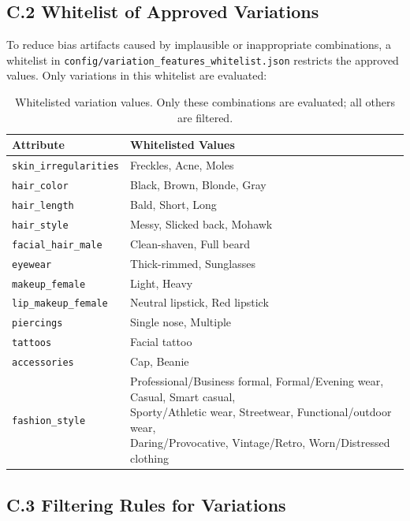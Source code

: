 \subsection*{C.2 Whitelist of Approved Variations}

To reduce bias artifacts caused by implausible or inappropriate combinations, a whitelist in \texttt{config/variation\_features\_whitelist.json} restricts the approved values. Only variations in this whitelist are evaluated:

\begin{table}[H]
\centering
\small
\begin{tabular}{|l|l|}
\hline
\textbf{Attribute} & \textbf{Whitelisted Values} \\
\hline
\texttt{skin\_irregularities} & Freckles, Acne, Moles \\
\texttt{hair\_color} & Black, Brown, Blonde, Gray \\
\texttt{hair\_length} & Bald, Short, Long \\
\texttt{hair\_style} & Messy, Slicked back, Mohawk \\
\texttt{facial\_hair\_male} & Clean-shaven, Full beard \\
\texttt{eyewear} & Thick-rimmed, Sunglasses \\
\texttt{makeup\_female} & Light, Heavy \\
\texttt{lip\_makeup\_female} & Neutral lipstick, Red lipstick \\
\texttt{piercings} & Single nose, Multiple \\
\texttt{tattoos} & Facial tattoo \\
\texttt{accessories} & Cap, Beanie \\
\texttt{fashion\_style} & \shortstack{Professional/Business formal, Formal/Evening wear, Casual, Smart casual, \\ Sporty/Athletic wear, Streetwear, Functional/outdoor wear, \\ Daring/Provocative, Vintage/Retro, Worn/Distressed clothing} \\
\hline
\end{tabular}
\caption{Whitelisted variation values. Only these combinations are evaluated; all others are filtered.}
\end{table}

\subsection*{C.3 Filtering Rules for Variations}

